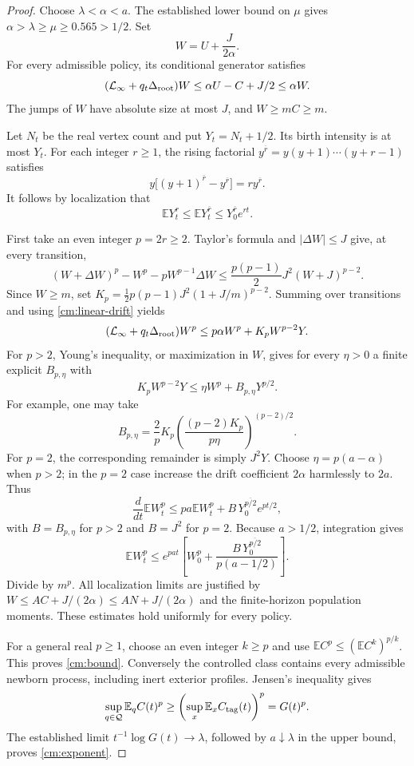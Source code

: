 \begin{proof}
Choose $\lambda<\alpha<a$. The established lower bound on $\mu$ gives
$\alpha>\lambda\ge\mu\ge0.565>1/2$. Set
\[
 W=U+\frac{J}{2\alpha}.
\]
For every admissible policy, its conditional generator satisfies
\begin{equation}\label{cm:linear-drift}
 (\mathcal L_\infty+q_t\Delta_{\rm root})W
 \le\alpha U-C+J/2\le\alpha W.
\end{equation}
The jumps of $W$ have absolute size at most $J$, and $W\ge mC\ge m$.

Let $N_t$ be the real vertex count and put $Y_t=N_t+1/2$. Its birth
intensity is at most $Y_t$. For each integer $r\ge1$, the rising
factorial $y^{\overline r}=y(y+1)\cdots(y+r-1)$ satisfies
\[
 y\bigl[(y+1)^{\overline r}-y^{\overline r}\bigr]
 =r y^{\overline r}.
\]
It follows by localization that
\begin{equation}\label{cm:population}
 \mathbb E Y_t^r\le
 \mathbb E Y_t^{\overline r}
 \le Y_0^{\overline r}e^{rt}.
\end{equation}

First take an even integer $p=2r\ge2$. Taylor's formula and
$|\Delta W|\le J$ give, at every transition,
\[
 (W+\Delta W)^p-W^p-pW^{p-1}\Delta W
 \le\frac{p(p-1)}2J^2(W+J)^{p-2}.
\]
Since $W\ge m$, set
$K_p=\tfrac12p(p-1)J^2(1+J/m)^{p-2}$. Summing over transitions and
using \eqref{cm:linear-drift} yields
\[
 (\mathcal L_\infty+q_t\Delta_{\rm root})W^p
 \le p\alpha W^p+K_p W^{p-2}Y.
\]
For $p>2$, Young's inequality, or maximization in $W$, gives for every
$\eta>0$ a finite explicit $B_{p,\eta}$ with
\[
 K_p W^{p-2}Y\le\eta W^p+B_{p,\eta}Y^{p/2}.
\]
For example, one may take
\[
 B_{p,\eta}=\frac2p K_p
 \left(\frac{(p-2)K_p}{p\eta}\right)^{(p-2)/2}.
\]
For $p=2$, the corresponding remainder is simply $J^2Y$.
Choose $\eta=p(a-\alpha)$ when $p>2$; in the $p=2$ case increase
the drift coefficient $2\alpha$ harmlessly to $2a$. Thus
\[
 \frac d{dt}\mathbb E W_t^p
 \le pa\mathbb E W_t^p+B\,Y_0^{\overline {p/2}}e^{pt/2},
\]
with $B=B_{p,\eta}$ for $p>2$ and $B=J^2$ for $p=2$.
Because $a>1/2$, integration gives
\begin{equation}\label{cm:explicit-even}
 \mathbb E W_t^p
 \le e^{pa t}\left[
 W_0^p+\frac{B\,Y_0^{\overline {p/2}}}{p(a-1/2)}\right].
\end{equation}
Divide by $m^p$. All localization limits are justified by
$W\le AC+J/(2\alpha)\le AN+J/(2\alpha)$ and the finite-horizon
population moments. These estimates hold uniformly for every policy.

For a general real $p\ge1$, choose an even integer $k\ge p$ and use
$\mathbb E C^p\le(\mathbb E C^k)^{p/k}$. This proves
\eqref{cm:bound}. Conversely the controlled class contains every admissible
newborn process, including inert exterior profiles. Jensen's inequality gives
\[
 \sup_{q\in\mathcal Q}\mathbb E_q C(t)^p
 \ge \left(\sup_x\mathbb E_x C_{\rm tag}(t)\right)^p=G(t)^p.
\]
The established limit $t^{-1}\log G(t)\to\lambda$, followed by
$a\downarrow\lambda$ in the upper bound, proves
\eqref{cm:exponent}.
\end{proof}

